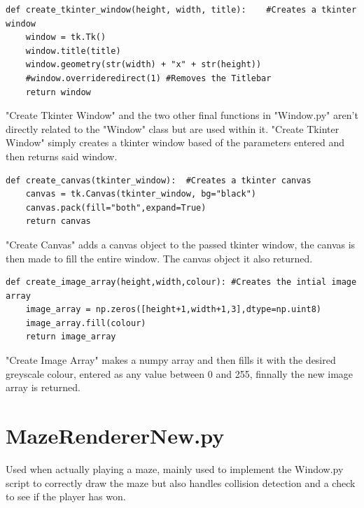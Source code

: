\begin{lstlisting}
def create_tkinter_window(height, width, title):    #Creates a tkinter window
    window = tk.Tk()
    window.title(title)
    window.geometry(str(width) + "x" + str(height))
    #window.overrideredirect(1) #Removes the Titlebar
    return window
\end{lstlisting}
"Create Tkinter Window" and the two other final functions in "Window.py" aren't directly related to the "Window" class but are used within it. "Create Tkinter Window" simply creates
a tkinter window based of the parameters entered and then returns said window.
\begin{lstlisting}
def create_canvas(tkinter_window):  #Creates a tkinter canvas
    canvas = tk.Canvas(tkinter_window, bg="black")
    canvas.pack(fill="both",expand=True)
    return canvas
\end{lstlisting}
"Create Canvas" adds a canvas object to the passed tkinter window, the canvas is then made to fill the entire window. The canvas object it also returned.
\begin{lstlisting}
def create_image_array(height,width,colour): #Creates the intial image array
    image_array = np.zeros([height+1,width+1,3],dtype=np.uint8)
    image_array.fill(colour)
    return image_array
\end{lstlisting}
"Create Image Array" makes a numpy array and then fills it with the desired greyscale colour, entered as any value between 0 and 255, finnally the new image
array is returned.

\clearpage
\section{MazeRendererNew.py}
Used when actually playing a maze, mainly used to implement the Window.py script to correctly draw the maze but also handles collision detection and a check to see if the player has won.

